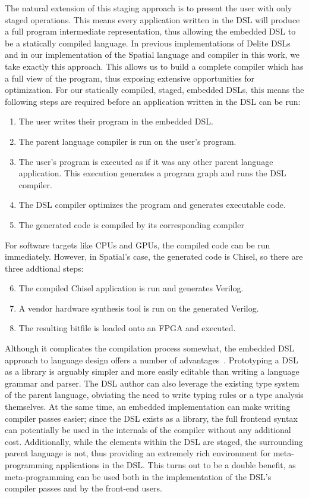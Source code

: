 The natural extension of this staging approach is to present the user with only
staged operations. This means every application written in the DSL will produce
a full program intermediate representation, thus allowing the embedded DSL
to be a statically compiled language.
In previous implementations of Delite DSLs and in our implementation of the
Spatial language and compiler in this work, we take exactly this approach.
This allows us to build a complete compiler which has
a full view of the program, thus exposing extensive opportunities for optimization.
For our statically compiled, staged, embedded DSLs, this means the following steps are required before
an application written in the DSL can be run:
\begin{enumerate}
\item The user writes their program in the embedded DSL.
\item The parent language compiler is run on the user's program.
\item The user's program is executed as if it was any other parent language application.
      This execution generates a program graph and runs the DSL compiler.
\item The DSL compiler optimizes the program and generates executable code.
\item The generated code is compiled by its corresponding compiler
\end{enumerate}

For software targets like CPUs and GPUs, the compiled code can be run immediately.
However, in Spatial's case, the generated code is Chisel,
so there are three addtional steps:
\begin{enumerate}
\setcounter{enumi}{5}
\item The compiled Chisel application is run and generates Verilog.
\item A vendor hardware synthesis tool is run on the generated Verilog.
\item The resulting bitfile is loaded onto an FPGA and executed.
\end{enumerate}

Although it complicates the compilation process somewhat,
the embedded DSL approach to language design offers a number of advantages~\cite{forge}.
Prototyping a DSL as a library
is arguably simpler and more easily editable than writing a language grammar and parser.
The DSL author can also leverage the existing type system of the parent language,
obviating the need to write typing rules or a type analysis themselves.
At the same time, an embedded implementation can make writing compiler passes easier;
since the DSL exists as a library, the full frontend syntax can potentially be
used in the internals of the compiler without any additional cost.
Additionally, while the elements within the DSL are staged, the surrounding
parent language is not, thus providing an extremely rich environment for
meta-programming applications in the DSL. This turns out to be a double benefit,
as meta-programming can be used both in the implementation of the DSL's compiler
passes and by the front-end users.

